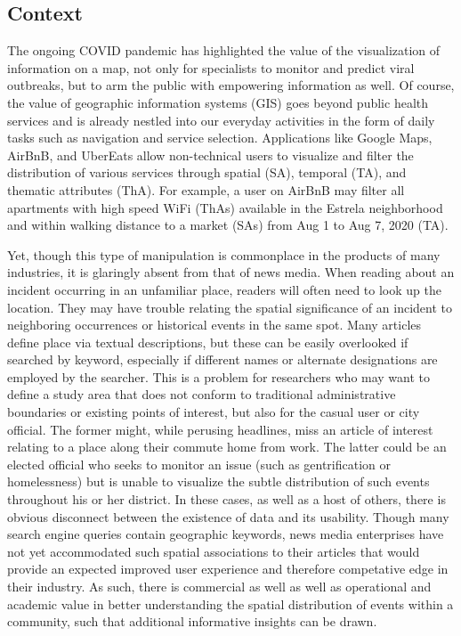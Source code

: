 \subsection{Context}
The ongoing COVID pandemic has highlighted the value of the visualization of information on a map, not only for specialists to monitor and predict viral outbreaks, but to arm the public with empowering information as well. Of course, the value of geographic information systems (GIS) goes beyond public health services and is already nestled into our everyday activities in the form of daily tasks such as navigation and service selection. Applications like Google Maps, AirBnB, and UberEats allow non-technical users to visualize and filter the distribution of various services through spatial (SA), temporal (TA), and thematic attributes (ThA). For example, a user on AirBnB may filter all apartments with high
speed WiFi (ThAs) available in the Estrela neighborhood and within walking distance to a market (SAs) from Aug 1 to Aug 7, 2020 (TA).

Yet, though this type of manipulation is commonplace in the products of many industries, it is glaringly absent from that of news media. When reading about an incident occurring in an unfamiliar place, readers will often need to look up the location. They may have trouble relating the spatial significance of an incident to neighboring occurrences or historical events in the same spot. Many articles define place via textual descriptions, but these can be easily overlooked if searched by keyword, especially if different names or alternate designations are employed by the searcher. This is a problem for researchers who may want to define a study area that does not conform to traditional administrative boundaries or existing points of interest, but also for the casual user or city official. The former might, while perusing headlines, miss an article of interest relating to a place along their commute home from work. The latter could be an elected official who seeks to monitor an issue (such as gentrification or homelessness) but is unable to visualize the subtle distribution of such events throughout his or her district. In these cases, as well as a host of others, there is obvious disconnect between the existence of data and its usability. Though many search engine queries contain geographic keywords\cite{Silva2006}, news media enterprises have not yet accommodated such spatial associations to their articles that would provide an expected improved user experience and therefore competative edge in their industry. As such, there is commercial as well as well as operational and academic value in better understanding the spatial distribution of events within a community, such that additional informative insights can be drawn.

